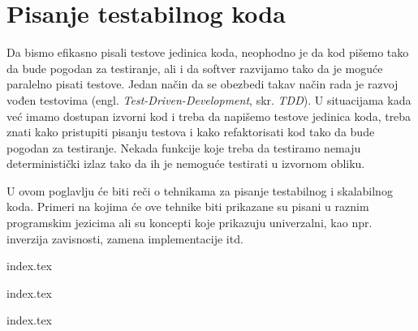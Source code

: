 \section{Pisanje testabilnog koda}\label{pisanje-testabilnog-koda}

Da bismo efikasno pisali testove jedinica koda, neophodno je da kod pišemo tako da bude pogodan za testiranje, ali i da softver razvijamo tako da je moguće paralelno pisati testove. Jedan način da se obezbedi takav način rada je razvoj vođen testovima (engl. \emph{Test-Driven-Development}, skr. \emph{TDD}). U situacijama kada već imamo dostupan izvorni kod i treba da napišemo testove jedinica koda, treba znati kako pristupiti pisanju testova i kako refaktorisati kod tako da bude pogodan za testiranje. Nekada funkcije koje treba da testiramo nemaju deterministički izlaz tako da ih je nemoguće testirati u izvornom obliku.

U ovom poglavlju će biti reči o tehnikama za pisanje testabilnog i skalabilnog koda. Primeri na kojima će ove tehnike biti prikazane su pisani u raznim programskim jezicima ali su koncepti koje prikazuju univerzalni, kao npr. inverzija zavisnosti, zamena implementacije itd.

{index.tex}

{index.tex}

{index.tex}
